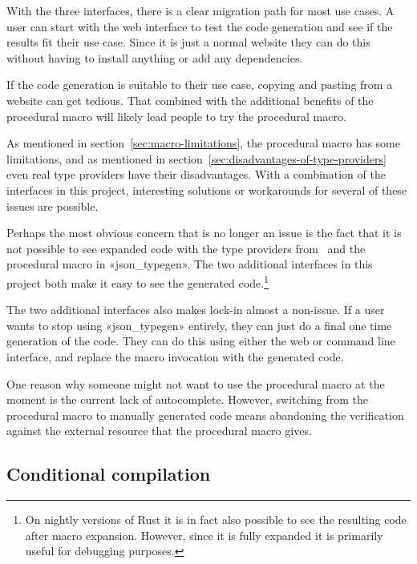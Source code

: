 With the three interfaces, there is a clear migration path for most use cases. A user can start with the web interface to test the code generation and see if the results fit their use case. Since it is just a normal website they can do this without having to install anything or add any dependencies.

If the code generation is suitable to their use case, copying and pasting from a website can get tedious. That combined with the additional benefits of the procedural macro will likely lead people to try the procedural macro.

As mentioned in section~\ref{sec:macro-limitations}, the procedural macro has some limitations, and as mentioned in section~\ref{sec:disadvantages-of-type-providers} even real type providers have their disadvantages. With a combination of the interfaces in this project, interesting solutions or workarounds for several of these issues are possible.

Perhaps the most obvious concern that is no longer an issue is the fact that it is not possible to see expanded code with the type providers from \fsharpdata\ and the procedural macro in «json_typegen».
The two additional interfaces in this project both make it easy to see the generated code.\footnote{On nightly versions of Rust it is in fact also possible to see the resulting code after macro expansion. However, since it is fully expanded it is primarily useful for debugging purposes.}

The two additional interfaces also makes lock-in almost a non-issue. If a user wants to stop using «json_typegen» entirely, they can just do a final one time generation of the code. They can do this using either the web or command line interface, and replace the macro invocation with the generated code.

One reason why someone might not want to use the procedural macro at the moment is the current lack of autocomplete. However, switching from the procedural macro to manually generated code means abandoning the verification against the external resource that the procedural macro gives.

\subsection{Conditional compilation}


